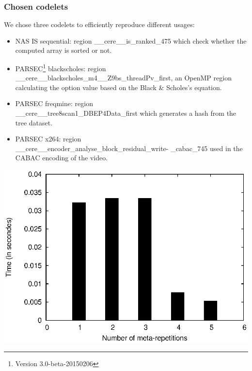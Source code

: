 \documentclass{article}
\newenvironment{Figure}
  {\par\medskip\noindent\center\minipage{0.9\linewidth}}
  {\endminipage\par\bigskip\medskip}
\begin{document}
\begin{multicols}{2}
\subsubsection{Chosen codelets}
We chose three codelets to efficiently reproduce different usages:
\begin{itemize}
\item NAS IS sequential: region \_\_cere\_\_is\_ranked\_475 which check whether the computed array is sorted or not.
\item PARSEC\footnote{Version 3.0-beta-20150206} blackscholes: region \\ \_\_cere\_\_blackscholes\_m4\_\_Z9bs\_threadPv\_first, an OpenMP region calculating the option value based on the Black \& Scholes's equation.
\item PARSEC freqmine: region\\ \_\_cere\_\_tree8scan1\_DBEP4Data\_first which generates a hash from the tree dataset.
\item PARSEC x264: region \\ \_\_cere\_\_encoder\_analyse\_block\_residual\_write- \_cabac\_745 used in the CABAC encoding of the video.
\end{itemize}


\begin{Figure}
\centering
\includegraphics[width=\linewidth]{nogood.eps}
\end{Figure}

\end{multicols}
\end{document}
